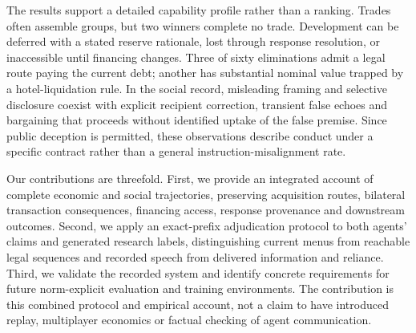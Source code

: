 The results support a detailed capability profile rather than a ranking. Trades often assemble groups, but two winners complete no trade. Development can be deferred with a stated reserve rationale, lost through response resolution, or inaccessible until financing changes. Three of sixty eliminations admit a legal route paying the current debt; another has substantial nominal value trapped by a hotel-liquidation rule. In the social record, misleading framing and selective disclosure coexist with explicit recipient correction, transient false echoes and bargaining that proceeds without identified uptake of the false premise. Since public deception is permitted, these observations describe conduct under a specific contract rather than a general instruction-misalignment rate.

Our contributions are threefold. First, we provide an integrated account of complete economic and social trajectories, preserving acquisition routes, bilateral transaction consequences, financing access, response provenance and downstream outcomes. Second, we apply an exact-prefix adjudication protocol to both agents' claims and generated research labels, distinguishing current menus from reachable legal sequences and recorded speech from delivered information and reliance. Third, we validate the recorded system and identify concrete requirements for future norm-explicit evaluation and training environments. The contribution is this combined protocol and empirical account, not a claim to have introduced replay, multiplayer economics or factual checking of agent communication.

